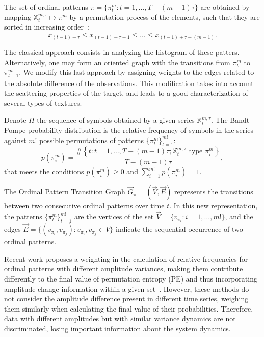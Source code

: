 \documentclass{isprs}
\begin{document}
	The set of ordinal patterns $\pi = \{\pi_t^m: t = 1, \dots, T- (m-1) \tau \}$ are obtained by mapping $\mathbb{X}^{m, \tau}_t \mapsto \pi^m$ by a permutation process of the elements, such that they are sorted in increasing order~\citep{Ravetti2014noise}:
	$$
	x_{(t-1) + \tau} \leq x_{(t-1) + \tau + 1} \leq \dots \leq x_{(t-1) + \tau + (m-1)}.
	$$
	
	The classical approach consists in analyzing the histogram of these patters.
	Alternatively, one may form an oriented graph with the transitions from $\pi_t^m$ to $\pi_{t+1}^m$.
	We modify this last approach by assigning weights to the edges related to the absolute difference of the observations.
	This modification takes into account the scattering properties of the target, and leads to a good characterization of several types of textures.
	
	Denote $\Pi$ the sequence of symbols obtained by a given series $\mathbb{X}_t^{m,\tau}$.
	The Bandt-Pompe probability distribution is the relative frequency of symbols in the series against $m!$ possible permutations of patterns $\{\pi_t^m \}_{t = 1}^{m!}$:
	\begin{equation}
	p(\pi_i^m) = \frac{\#\left \{t : t = 1, \dots, T-(m-1)\tau; \mathbb{X}_t^{m,\tau} \text{ type } \pi_i^m\right \}}{T- (m-1)\tau},  
	\end{equation}
	that meets the conditions $p(\pi_i^m) \ge 0$ and  $\sum_{i=1}^{m!} p(\pi_i^m) = 1$.
	
	The Ordinal Pattern Transition Graph $\vec{G}_{\pi} = (\vec{V}, \vec{E})$ represents the transitions between two consecutive ordinal patterns over time $t$.
	In this new representation, the patterns $\{\pi_t^m \}_{t = 1}^{m!}$ are the vertices of the set $\vec{V} = \{v_{\pi_i}: i = 1, \dots, m! \}$, and the edges $\vec{E} = \{(v_{\pi_i}, v_{\pi_j}): v_{\pi_i}, v_{\pi_j} \in V \}$ indicate the sequential occurrence of two ordinal patterns.
	
	Recent work proposes a weighting in the calculation of relative frequencies for ordinal patterns with different amplitude variances, making them contribute differently to the final value of permutation entropy (PE) and thus incorporating amplitude change information within a given set~\citep{Fadlallah2013Weightedpermutation}.
	However, these methods do not consider the amplitude difference present in different time series, weighing them similarly when calculating the final value of their probabilities.
	Therefore, data with different amplitudes but with similar variance dynamics are not discriminated, losing important information about the system dynamics.
	
\end{document}
